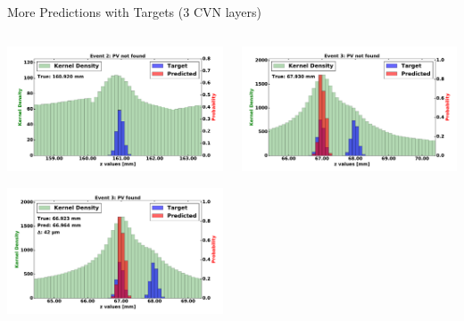 \begin{frame}{More Predictions with Targets (3 CVN layers)}
  \begin{columns}[c]
        \begin{center}
            \includegraphics[width=1\textwidth,height=0.45\textwidth, trim=18 0 18 0]{images/120000_3layer_16.pdf}

            \includegraphics[width=1\textwidth, height=0.45\textwidth,trim=18 0 18 0]{images/120000_3layer_17.pdf}

        \end{center}
        \begin{center}
           \includegraphics[width=1\textwidth, height=0.45\textwidth, trim=18 0 18 0]{images/120000_3layer_18.pdf}


\end{center}
\end{columns}
\end{frame}
